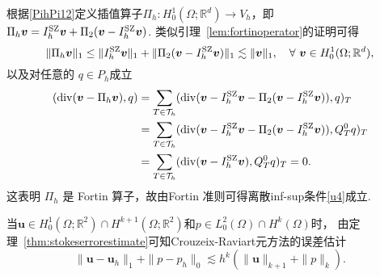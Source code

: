 \begin{prf}
根据\eqref{PihPi12}定义插值算子$\Pi_{h}: H_0^{1}(\Omega; \mathbb{R}^{d})\rightarrow  V_{h}$，即
$\Pi_{h}\boldsymbol{v}=I_h^{\rm SZ}\boldsymbol{v}
+\Pi_{2}(\boldsymbol{v}-I_h^{\rm SZ}\boldsymbol{v})$. 类似引理~\ref{lem:fortinoperator}的证明可得
\begin{equation*}
\|\Pi_{h}\boldsymbol{v}\|_1\leq\|I_h^{\rm SZ}\boldsymbol{v}\|_1+\|\Pi_{2}(\boldsymbol{v}-I_h^{\rm SZ}\boldsymbol{v})\|_1\lesssim \|\boldsymbol{v}\|_1, \quad\forall~\boldsymbol{v}\in H_0^{1}(\Omega; \mathbb{R}^{d}),
\end{equation*}
以及对任意的 $q\in P_h$成立
\begin{align*}
(\div(\boldsymbol{v}-\Pi_{h}\boldsymbol{v}), q) &= \sum_{T\in\mathcal T_h}(\div(\boldsymbol{v}-I_h^{\rm SZ}\boldsymbol{v}
-\Pi_{2}(\boldsymbol{v}-I_h^{\rm SZ}\boldsymbol{v})), q)_T \\
&= \sum_{T\in\mathcal T_h}(\div(\boldsymbol{v}-I_h^{\rm SZ}\boldsymbol{v}
-\Pi_{2}(\boldsymbol{v}-I_h^{\rm SZ}\boldsymbol{v})), Q_T^0q)_T \\
&= \sum_{T\in\mathcal T_h}(\div(\boldsymbol{v}-I_h^{\rm SZ}\boldsymbol{v}), Q_T^0q)_T =0.
\end{align*}
这表明 $\Pi_{h}$ 是 Fortin 算子，故由Fortin 准则可得离散inf-sup条件\eqref{u4}成立.
\end{prf}

当$\boldsymbol{u}\in H_0^1(\Omega;\mathbb R^2)\cap H^{k+1}(\Omega;\mathbb R^2)$和$p\in L_0^2(\Omega)\cap H^k(\Omega)$时， 由定理~\ref{thm:stokeserrorestimate}可知Crouzeix-Raviart元方法的误差估计
\begin{equation*}
\|\boldsymbol{u}-\boldsymbol{u}_h\|_{1} + \|p-p_h\|_{0}
\lesssim h^k(\|\boldsymbol{u}\|_{k+1}+\|p\|_k).
\end{equation*}

